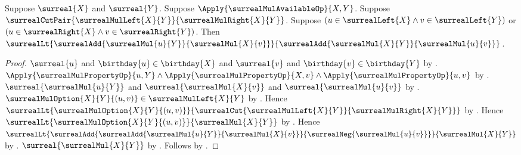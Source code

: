 \begin{lemma}\label{surreal_mul_left_inequality_from_available}
    Suppose $\surreal{X}$ and $\surreal{Y}$.
    Suppose $\Apply{\surrealMulAvailableOp}{X,Y}$.
    Suppose $\surrealCutPair{\surrealMulLeft{X}{Y}}
        {\surrealMulRight{X}{Y}}$.
    Suppose $(u\in\surrealLeft{X}\land v\in\surrealLeft{Y})$
        or $(u\in\surrealRight{X}\land v\in\surrealRight{Y})$.
    Then
        $\surrealLt
            {\surrealAdd{\surrealMul{u}{Y}}{\surrealMul{X}{v}}}
            {\surrealAdd{\surrealMul{X}{Y}}{\surrealMul{u}{v}}}$.
\end{lemma}
\begin{proof}
    $\surreal{u}$ and $\birthday{u}\in\birthday{X}$ and
        $\surreal{v}$ and $\birthday{v}\in\birthday{Y}$
        by .
    $\Apply{\surrealMulPropertyOp}{u,Y}
        \land\Apply{\surrealMulPropertyOp}{X,v}
        \land\Apply{\surrealMulPropertyOp}{u,v}$
        by .
    $\surreal{\surrealMul{u}{Y}}$ and
        $\surreal{\surrealMul{X}{v}}$ and
        $\surreal{\surrealMul{u}{v}}$
        by .
    $\surrealMulOption{X}{Y}{(u,v)}
        \in\surrealMulLeft{X}{Y}$
        by .
    Hence
        $\surrealLt{\surrealMulOption{X}{Y}{(u,v)}}
            {\surrealCut{\surrealMulLeft{X}{Y}}{\surrealMulRight{X}{Y}}}$
        by .
    Hence
        $\surrealLt{\surrealMulOption{X}{Y}{(u,v)}}
            {\surrealMul{X}{Y}}$
        by .
    Hence
        $\surrealLt
            {\surrealAdd
                {\surrealAdd{\surrealMul{u}{Y}}{\surrealMul{X}{v}}}
                {\surrealNeg{\surrealMul{u}{v}}}}
            {\surrealMul{X}{Y}}$
        by .
    $\surreal{\surrealMul{X}{Y}}$
        by .
    Follows by
        .
\end{proof}


